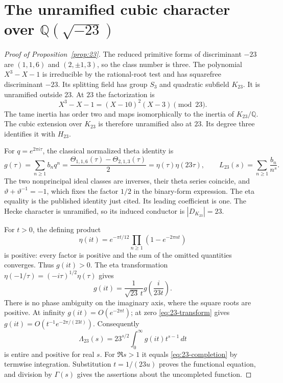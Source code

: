 \documentclass[11pt]{article}
\newcommand{\Q}{\mathbb Q}
\begin{document}
\section{The unramified cubic character over
\texorpdfstring{$\mathbb Q(\sqrt{-23})$}{Q(sqrt(-23))}}


\begin{proof}[Proof of Proposition~\ref{prop:23}]
The reduced primitive forms of discriminant $-23$ are
$(1,1,6)$ and $(2,\pm1,3)$, so the class number is three.
The polynomial $X^3-X-1$ is irreducible by the rational-root test and
has squarefree discriminant $-23$. Its splitting field has group $S_3$
and quadratic subfield $K_{23}$. It is unramified outside $23$.
At $23$ the factorization is
\[
 X^3-X-1=(X-10)^2(X-3)\pmod{23}.
 \tag{33}\label{eq:23-factor}
\]
The tame inertia has order two and maps isomorphically to the inertia
of $K_{23}/\Q$. The cubic extension over $K_{23}$ is therefore
unramified also at $23$. Its degree three identifies it with $H_{23}$.

For $q=e^{2\pi i\tau}$, the classical normalized theta identity is
\[
 g(\tau)=\sum_{n\ge1}b_nq^n
 =\frac{\Theta_{1,1,6}(\tau)-\Theta_{2,1,3}(\tau)}2
 =\eta(\tau)\eta(23\tau),\qquad
 L_{23}(s)=\sum_{n\ge1}\frac{b_n}{n^s}.
 \tag{34}\label{eq:23-theta}
\]
The two nonprincipal ideal classes are inverses, their theta series
coincide, and $\vartheta+\vartheta^{-1}=-1$, which fixes the factor
$1/2$ in the binary-form expression. The eta equality is the published
identity just cited. Its leading coefficient is one. The Hecke character
is unramified, so its induced conductor is $|D_{K_{23}}|=23$.

For $t>0$, the defining product
\[
 \eta(it)=e^{-\pi t/12}\prod_{n\ge1}(1-e^{-2\pi nt})
 \tag{35}\label{eq:eta-positive}
\]
is positive: every factor is positive and the sum of the omitted
quantities converges. Thus $g(it)>0$. The eta transformation
$\eta(-1/\tau)=(-i\tau)^{1/2}\eta(\tau)$
\citep[Equations~23.18.5--23.18.7]{DLMF} gives
\[
 g(it)=\frac1{\sqrt{23}\,t}
             g\left(\frac{i}{23t}\right).
 \tag{36}\label{eq:23-transform}
\]
There is no phase ambiguity on the imaginary axis, where the square
roots are positive. At infinity $g(it)=O(e^{-2\pi t})$; at zero
\eqref{eq:23-transform} gives
$g(it)=O(t^{-1}e^{-2\pi/(23t)})$. Consequently
\[
 \Lambda_{23}(s)=23^{s/2}\int_0^\infty g(it)t^{s-1}\,dt
 \tag{37}\label{eq:23-Mellin}
\]
is entire and positive for real $s$. For $\Re s>1$ it equals
\eqref{eq:23-completion} by termwise integration. Substitution
$t=1/(23u)$ proves the functional equation, and division by
$\Gamma(s)$ gives the assertions about the uncompleted function.
\end{proof}
\end{document}
